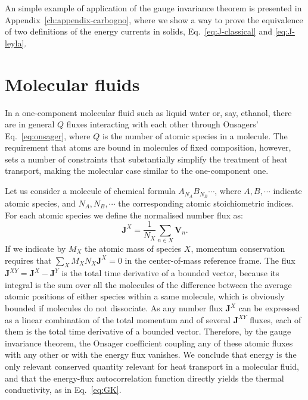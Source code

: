 \medskip
An simple example of application of the gauge invariance theorem is presented in Appendix~\ref{ch:appendix-carbogno}, where we show a way to prove the equivalence of two definitions of the energy currents in solids, Eq.~\eqref{eq:J-classical} and \eqref{eq:J-leyla}.


\section{Molecular fluids}  \label{sec:MolecularFluids}
In a one-component molecular fluid such as liquid water or, say, ethanol, there are in general $Q$ fluxes interacting with each other through Onsagers' Eq.~\eqref{eq:onsager}, where $Q$ is the number of atomic species in a molecule. The requirement that atoms are bound in molecules of fixed composition, however, sets a number of constraints that substantially simplify the treatment of heat transport, making the molecular case similar to the one-component one.

Let us consider a molecule of chemical formula $A_{N_A} B_{N_B}\cdots$, where $A, B,\cdots$ indicate atomic species, and $N_A,N_B,\cdots$ the corresponding atomic stoichiometric indices. For each atomic species we define the normalised number flux as:
\begin{equation}
  \mathbf{J}^X = \frac{1}{N_X}\sum_{n\in X} \mathbf{V}_n. \label{eq:JX}
\end{equation}
If we indicate by $M_X$ the atomic mass of species $X$, momentum conservation requires that $\sum_X M_X N_X \mathbf{J}^X = 0$ in the center-of-mass reference frame. The flux $\mathbf{J}^{XY} = \mathbf{J}^{X}-\mathbf{J}^{Y}$ is the total time derivative of a bounded vector, because its integral is the sum over all the molecules of the difference between the average atomic positions of either species within a same molecule, which is obviously bounded if molecules do not dissociate. As any number flux $\mathbf{J}^X$ can be expressed as a linear combination of the total momentum and of several $\mathbf{J}^{XY}$ fluxes, each of them is the total time derivative of a bounded vector. Therefore, by the gauge invariance theorem, the Onsager coefficient coupling any of these atomic fluxes with any other or with the energy flux vanishes. We conclude that energy is the only relevant conserved quantity relevant for heat transport in a molecular fluid, and that the energy-flux autocorrelation function directly yields the thermal conductivity, as in Eq.~\eqref{eq:GK}.


